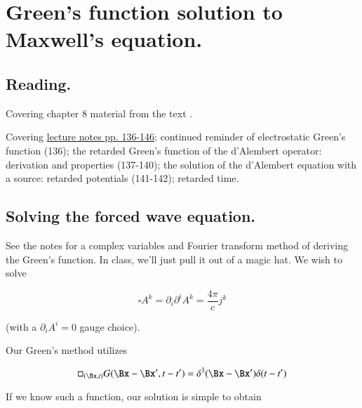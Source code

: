 %
%

\chapter{Green's function solution to Maxwell's equation.}
\label{chap:relativisticElectrodynamicsL18}
{}
\date{Mar 9, 2011}

\beginArtNoToc

\section{Reading.}

Covering chapter 8 material from the text \citep{landau1980classical}.

Covering \href{http://www.physics.utoronto.ca/~poppitz/epoppitz/PHY450_files/RelEMpp136-146.pdf}{lecture notes pp. 136-146}: continued reminder of electrostatic Green's function (136); the retarded Green's function of the d'Alembert operator: derivation and properties (137-140); the solution of the d'Alembert equation with a source: retarded potentials (141-142); retarded time.

\section{Solving the forced wave equation.}

See the notes for a complex variables and Fourier transform method of deriving the Green's function.  In class, we'll just pull it out of a magic hat.  We wish to solve

\begin{equation}\label{eqn:relativisticElectrodynamicsL18:10}
\square A^k = \partial_i \partial^i A^k = \frac{4 \pi}{c} j^k
\end{equation}

(with a $\partial_i A^i = 0$ gauge choice).

Our Green's method utilizes

\begin{equation}\label{eqn:relativisticElectrodynamicsL18:30}
\square_{(\Bx, t)} G(\Bx - \Bx', t - t') = \delta^3( \Bx - \Bx') \delta( t - t')
\end{equation}

If we know such a function, our solution is simple to obtain

